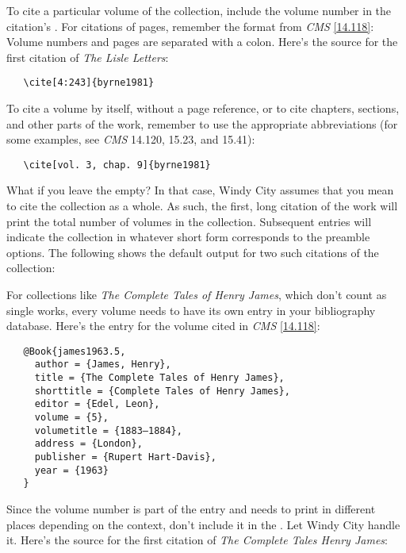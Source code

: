 \documentclass[11pt,letterpaper,oneside]{article}
\begin{document}
To cite a particular volume of the collection, include the volume
number in the citation's . For citations of pages,
remember the format from \textit{CMS} \ref{14.118}: Volume numbers and
pages are separated with a colon. Here's the source for the first
citation of \textit{The Lisle Letters}:

\begin{verbatim}
   \cite[4:243]{byrne1981}
\end{verbatim}

\noindent To cite a volume by itself, without a page reference, or to
cite chapters, sections, and other parts of the work, remember to use
the appropriate abbreviations (for some examples, see \textit{CMS}
14.120, 15.23, and 15.41):

\begin{verbatim}
   \cite[vol. 3, chap. 9]{byrne1981}
\end{verbatim}

What if you leave the  empty? In that case, Windy
City assumes that you mean to cite the collection as a whole. As such,
the first, long citation of the work will print the total number of
volumes in the collection. Subsequent entries will indicate the
collection in whatever short form corresponds to the preamble options.
The following shows the default output for two such citations of the
collection:

\begin{citeonly}
\item \cite{byrne1981}
\item \cite{byrne1981}
\end{citeonly}

For collections like \textit{The Complete Tales of Henry James}, which
don't count as single works, every volume needs to have its own entry
in your bibliography database. Here's the entry for the volume cited
in \textit{CMS} \ref{14.118}:

\begin{verbatim}
   @Book{james1963.5,
     author = {James, Henry},
     title = {The Complete Tales of Henry James},
     shorttitle = {Complete Tales of Henry James},
     editor = {Edel, Leon},
     volume = {5},
     volumetitle = {1883–1884},
     address = {London},
     publisher = {Rupert Hart-Davis},
     year = {1963}
   }
\end{verbatim}

Since the volume number is part of the entry and needs to print in
different places depending on the context, don't include it in the
. Let Windy City handle it. Here's the source for
the first citation of \textit{The Complete Tales Henry James}:
\end{document}
